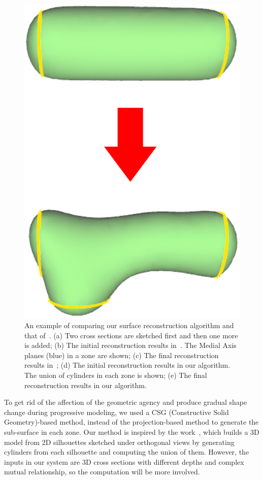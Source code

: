 \begin{figure} [htbp]
{\begin{minipage}[b]{0.18\textwidth}
      \includegraphics[scale=0.12]{figs/f3.surf-csgma-5.eps}
    \end{minipage}}
  \caption{An example of comparing our surface reconstruction algorithm  and that of~\cite{LBDLJ08}. (a) Two cross sections are sketched first and then one more is added; (b) The initial reconstruction results in~\cite{LBDLJ08}. The Medial Axis planes (blue) in a zone are shown; (c) The final reconstruction results in~\cite{LBDLJ08}; (d) The initial reconstruction results in our algorithm. The union of cylinders in each zone is shown; (e) The final reconstruction results in our algorithm.}
  \label{fig:csgma} %
\end{figure}

To get rid of the affection of the geometric agency and produce
gradual shape change during progressive modeling, we used a CSG
(Constructive Solid Geometry)-based method, instead of the
projection-based method to generate the sub-surface in each zone.
Our method is inspired by the work~\cite{RDI10}, which builds a 3D
model from 2D silhouettes sketched under orthogonal views by
generating cylinders from each silhouette and computing the union of
them. However, the inputs in our system are 3D cross sections with
different depths and complex mutual relationship, so the computation
will be more involved.

